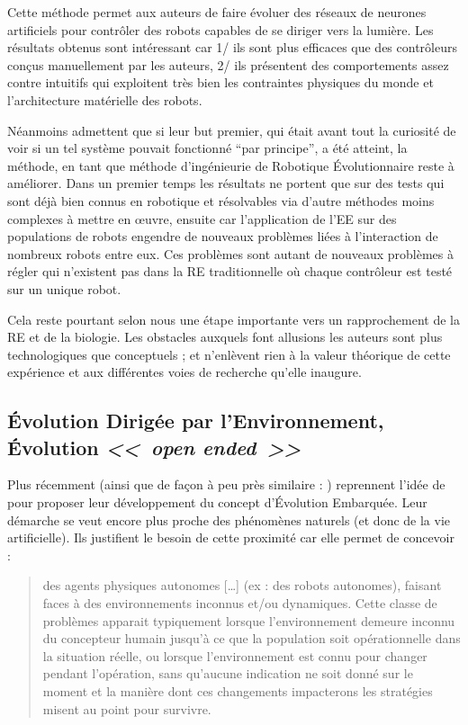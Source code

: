 Cette méthode permet aux auteurs de faire évoluer des réseaux de neurones artificiels pour contrôler des robots capables de se diriger vers la lumière. Les résultats obtenus sont intéressant car 1/ ils sont plus efficaces que des contrôleurs conçus manuellement par les auteurs, 2/ ils présentent des comportements assez contre intuitifs qui exploitent très bien les contraintes physiques du monde et l'architecture matérielle des robots.

Néanmoins \cite{watson02embodiedevolutiondistributingevolutionaryalgorithmpopulationrobots} admettent que si leur but premier, qui était avant tout la curiosité de voir si un tel système pouvait fonctionné ``par principe'', a été atteint, la méthode, en tant que méthode d'ingénieurie de Robotique \'Evolutionnaire reste à améliorer. Dans un premier temps les résultats ne portent que sur des tests qui sont déjà bien connus en robotique et résolvables via d'autre méthodes moins complexes à mettre en {\oe}uvre, ensuite car l'application de l'EE sur des populations de robots engendre de nouveaux problèmes liées à l'interaction de nombreux robots entre eux. Ces problèmes sont autant de nouveaux problèmes à régler qui n'existent pas dans la RE traditionnelle où chaque contrôleur est testé sur un unique robot.

Cela reste pourtant selon nous une étape importante vers un rapprochement de la RE et de la biologie. Les obstacles auxquels font allusions les auteurs sont plus technologiques que conceptuels ; et n'enlèvent rien à la valeur théorique de cette expérience et aux différentes voies de recherche qu'elle inaugure.

\subsection{\'Evolution Dirigée par l'Environnement, \'Evolution \emph{<<~open ended~>>}}

Plus récemment \cite{bredeche11mcmds} (ainsi que de façon à peu près similaire : \cite{trueba11taskdrivenspeciesevolutionaryroboticteams}) reprennent l'idée de \cite{watson02embodiedevolutiondistributingevolutionaryalgorithmpopulationrobots} pour proposer leur développement du concept d'\'Evolution Embarquée. Leur démarche se veut encore plus proche des phénomènes naturels (et donc de la vie artificielle). Ils justifient le besoin de cette proximité car elle permet de concevoir :
\begin{quotation}
   des agents physiques autonomes [\dots] (ex : des robots autonomes), faisant faces à des environnements inconnus et/ou dynamiques. Cette classe de problèmes apparait typiquement lorsque l'environnement demeure inconnu du concepteur humain jusqu'à ce que la population soit opérationnelle dans la situation réelle, ou lorsque l'environnement est connu pour changer pendant l'opération, sans qu'aucune indication ne soit donné sur le moment et la manière dont ces changements impacterons les stratégies misent au point pour survivre.
   \\\citep[p.1]{bredeche11mcmds}
\end{quotation}

